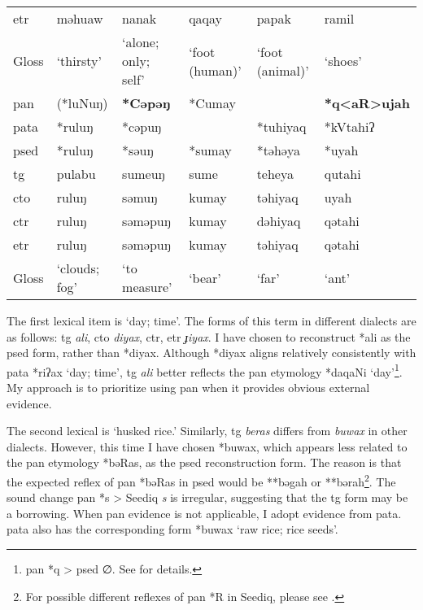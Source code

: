 \begin{table}[!htbp]
\begin{tabular}{l>{\raggedright\arraybackslash}p{2cm}>{\raggedright\arraybackslash}p{2cm}>{\raggedright\arraybackslash}p{2cm}>{\raggedright\arraybackslash}p{2cm}>{\raggedright\arraybackslash}p{2cm}}
\acs{etr}  & məhuaw        & nanak               & qaqay          & papak           & ramil                   \\
Gloss      & `thirsty'     & `alone; only; self' & `foot (human)' & `foot (animal)' & `shoes'                 \\ \hline\hline
\acs{pan}  & (*luNuŋ)       & \textbf{*Cəpəŋ}              & *Cumay         &                 & \textbf{*q<aR>ujah}              \\ 
\acs{pata} & *ruluŋ        & *cəpuŋ              &                & *tuhiyaq        & *kVtahiʔ                \\ 
\acs{psed} & *ruluŋ        & *səuŋ            & *sumay         & *təhəya         & *uyah                   \\ \hdashline
\acs{tg}   & pulabu        & sumeuŋ              & sume           & teheya          & qutahi                  \\
\acs{cto}  & ruluŋ         & səmuŋ               & kumay          & təhiyaq         & uyah                    \\
\acs{ctr}  & ruluŋ         & səməpuŋ             & kumay          & dəhiyaq         & qətahi                  \\
\acs{etr}  & ruluŋ         & səməpuŋ             & kumay          & təhiyaq         & qətahi                  \\
Gloss      & `clouds; fog' & `to measure'        & `bear'         & `far'           & `ant'                   \\ \hline
\end{tabular}
\end{table}
\endgroup

The first lexical item is `day; time'. The forms of this term in different dialects are as follows: \acl{tg} \textit{ali}, \acl{cto} \textit{diyax}, \acl{ctr}, \acl{etr} \textit{ɟiyax}. I have chosen to reconstruct *ali as the \acl{psed} form, rather than *diyax. Although *diyax aligns relatively consistently with \acl{pata} *riʔax `day; time', \acl{tg} \textit{ali} better reflects the \acl{pan} etymology *daqaNi `day'\footnote{\acs{pan} *q > \acs{psed} ∅. See \textcite{song2024sedq} for details.}. My approach is to prioritize using \acl{pan} when it provides obvious external evidence.

The second lexical is `husked rice.' Similarly, \acl{tg} \textit{beras} differs from \textit{buwax} in other dialects. However, this time I have chosen *buwax, which appears less related to the \acs{pan} etymology *bəRas, as the \acl{psed} reconstruction form. The reason is that the expected reflex of \acs{pan} *bəRas in \acl{psed} would be **bəgah or **bərah\footnote{For possible different reflexes of \acs{pan} *R in Seediq, please see \textcite{song2024Aicg}.}. The sound change \acs{pan} *s > Seediq \textit{s} is irregular, suggesting that the \acl{tg} form may be a borrowing. When \acs{pan} evidence is not applicable, I adopt evidence from \acl{pata}. \acl{pata} also has the corresponding form *buwax `raw rice; rice seeds'.

